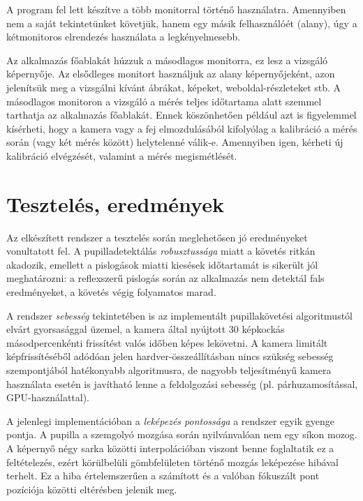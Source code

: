 A program fel lett készítve a több monitorral történő használatra. Amennyiben nem a saját tekintetünket követjük, hanem egy másik felhasználóét (alany), úgy a kétmonitoros elrendezés használata a legkényelmesebb.

Az alkalmazás főablakát húzzuk a másodlagos monitorra, ez lesz a vizsgáló képernyője. Az elsődleges monitort használjuk az alany képernyőjeként, azon jelenítsük meg a vizsgálni kívánt ábrákat, képeket, weboldal-részleteket stb. A másodlagos monitoron a vizsgáló a mérés teljes időtartama alatt szemmel tarthatja az alkalmazás főablakát. Ennek köszönhetően például azt is figyelemmel kísérheti, hogy a kamera vagy a fej elmozdulásából kifolyólag a kalibráció a mérés során (vagy két mérés között) helytelenné válik-e. Amennyiben igen, kérheti új kalibráció elvégzését, valamint a mérés megismétlését.

\section{Tesztelés, eredmények}\label{sect:teszteles}

Az elkészített rendszer a tesztelés során meglehetősen jó eredményeket vonultatott fel. A pupilladetektálás \emph{robusztussága} miatt a követés ritkán akadozik, emellett a pislogások miatti kiesések időtartamát is sikerült jól meghatározni: a reflexszerű pislogás során az alkalmazás nem detektál fals eredményeket, a követés végig folyamatos marad.

A rendszer \emph{sebesség} tekintetében is az implementált pupillakövetési algoritmustól elvárt gyorsasággal üzemel, a kamera által nyújtott 30 képkockás másodpercenkénti frissítést valós időben képes lekövetni. A kamera limitált képfrissítéséből adódóan jelen hardver-összeállításban nincs szükség sebesség szempontjából hatékonyabb algoritmusra, de nagyobb teljesítményű kamera használata esetén is javítható lenne a feldolgozási sebesség (pl. párhuzamosítással, GPU-használattal).

A jelenlegi implementációban a \emph{leképezés pontossága} a rendszer egyik gyenge pontja. A pupilla a szemgolyó mozgása során nyilvánvalóan nem egy síkon mozog. A képernyő négy sarka közötti interpolációban viszont benne foglaltatik ez a feltételezés, ezért körülbelüli gömbfelületen történő mozgás leképezése hibával terhelt. Ez a hiba értelemszerűen a számított és a valóban fókuszált pont pozíciója közötti eltérésben jelenik meg.

